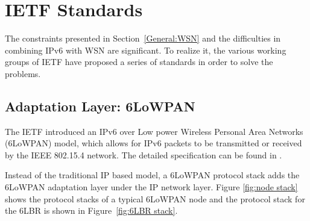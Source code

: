 \chapter{IETF Standards}
\label{IETF}
The constraints presented in Section~\ref{General:WSN} and the difficulties in combining IPv6 with WSN are significant. To realize it, the various working groups of IETF have proposed a series of standards in order to solve the problems.

\section{Adaptation Layer: 6LoWPAN}
\label{Intr:6LoWPAN}
The IETF introduced an IPv6 over Low power Wireless Personal Area Networks (6LoWPAN) model, which allows for IPv6 packets to be transmitted or received by the IEEE 802.15.4 network. The detailed specification can be found in \cite{RFC 4944}.

Instead of the traditional IP based model, a 6LoWPAN protocol stack adds the 6LoWPAN adaptation layer under the IP network layer. Figure \ref{fig:node stack} shows the protocol stacks of a typical 6LoWPAN node and the protocol stack for the 6LBR is shown in Figure~\ref{fig:6LBR stack}.

